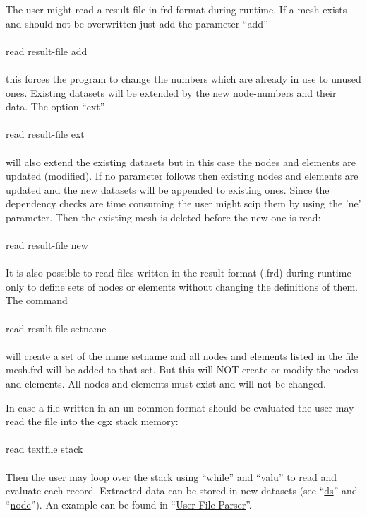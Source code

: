 \documentclass{article}
\providecommand{\htmlref}[2]{\hyperref[#2]{#1}}
\begin{document}
The user might read a result-file in frd format during runtime. If a mesh exists and should not be overwritten just add the parameter ``add''\\\\read result-file add\\\\this forces the program to change the numbers which are already in use to unused ones. Existing datasets will be extended by the new node-numbers and their data. The option ``ext'' \\\\read result-file ext\\\\will also extend the existing datasets but in this case the nodes and elements are updated (modified). If no parameter follows then existing nodes and elements are updated and the new datasets will be appended to existing ones. Since the dependency checks are time consuming the user might scip them by using the 'ne' parameter. Then the existing mesh is deleted before the new one is read:\\\\read result-file new\\\\

It is also possible to read files written in the result format (.frd) during runtime only to define sets of nodes or elements without changing the definitions of them. The command\\\\read result-file setname\\\\will create a set of the name setname and all nodes and elements listed in the file mesh.frd will be added to that set. But this will NOT create or modify the nodes and elements. All nodes and elements must exist and will not be changed.

In case a file written in an un-common format should be evaluated the user may read the file into the cgx stack memory:\\\\read textfile stack\\\\ Then the user may loop over the stack using ``\htmlref{while}{while}'' and ``\htmlref{valu}{valu}'' to read and evaluate each record. Extracted data can be stored in new datasets (see ``\htmlref{ds}{ds}'' and ``\htmlref{node}{node}''). An example can be found in ``\htmlref{User File Parser}{User File Parser}''.
\end{document}
